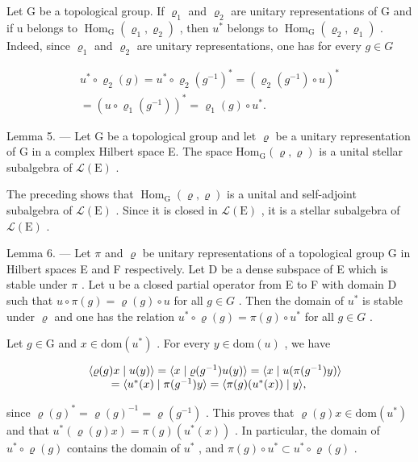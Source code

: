 Let G be a topological group. If \(\varrho_{1}\) and \(\varrho_{2}\) are unitary representations of G and if u belongs to \(\operatorname{Hom}_{\mathrm{G}}(\varrho_{1},\varrho_{2})\) , then \(u^{*}\) belongs to \(\operatorname{Hom}_{\mathrm{G}}(\varrho_{2},\varrho_{1})\) . Indeed, since \(\varrho_{1}\) and \(\varrho_{2}\) are unitary representations, one has for every \(g\in G\)

\[
\begin{array}{r} u ^ {*} \circ \varrho_ {2} (g) = u ^ {*} \circ \varrho_ {2} (g ^ {- 1}) ^ {*} = (\varrho_ {2} (g ^ {- 1}) \circ u) ^ {*} \\ = (u \circ \varrho_ {1} (g ^ {- 1})) ^ {*} = \varrho_ {1} (g) \circ u ^ {*}. \end{array}
\]

Lemma 5. --- Let G be a topological group and let \(\varrho\) be a unitary representation of G in a complex Hilbert space E. The space \(\mathrm{Hom}_{\mathrm{G}}(\varrho, \varrho)\) is a unital stellar subalgebra of \(\mathcal{L}(\mathrm{E})\) .

The preceding shows that \(\operatorname{Hom}_{\mathrm{G}}(\varrho,\varrho)\) is a unital and self-adjoint subalgebra of \(\mathcal{L}(\mathrm{E})\) . Since it is closed in \(\mathcal{L}(\mathrm{E})\) , it is a stellar subalgebra of \(\mathcal{L}(\mathrm{E})\) .

Lemma 6. --- Let \(\pi\) and \(\varrho\) be unitary representations of a topological group G in Hilbert spaces E and F respectively. Let D be a dense subspace of E which is stable under \(\pi\) . Let u be a closed partial operator from E to F with domain D such that \(u \circ \pi(g) = \varrho(g) \circ u\) for all \(g \in G\) . Then the domain of \(u^{*}\) is stable under \(\varrho\) and one has the relation \(u^{*} \circ \varrho(g) = \pi(g) \circ u^{*}\) for all \(g \in G\) .

Let \(g \in \mathrm{G}\) and \(x \in \mathrm{dom}(u^*)\) . For every \(y \in \mathrm{dom}(u)\) , we have

\[
\begin{array}{r l} & {\langle \varrho (g) x \mid u (y) \rangle = \langle x \mid \varrho (g ^ {- 1}) u (y) \rangle = \langle x \mid u (\pi (g ^ {- 1}) y) \rangle} \\ & {\qquad = \langle u ^ {*} (x) \mid \pi (g ^ {- 1}) y \rangle = \langle \pi (g) (u ^ {*} (x)) \mid y \rangle ,} \end{array}
\]

since \(\varrho(g)^{*} = \varrho(g)^{-1} = \varrho(g^{-1})\) . This proves that \(\varrho(g)x \in \mathrm{dom}(u^{*})\) and that \(u^{*}(\varrho(g)x) = \pi(g)(u^{*}(x))\) . In particular, the domain of \(u^{*} \circ \varrho(g)\) contains the domain of \(u^{*}\) , and \(\pi(g) \circ u^{*} \subset u^{*} \circ \varrho(g)\) .

